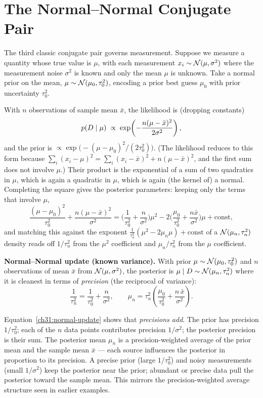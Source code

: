\section{The Normal--Normal Conjugate Pair}
\label{ch31:normal-normal}

The third classic conjugate pair governs measurement. Suppose we measure a quantity whose
true value is $\mu$, with each measurement $x_i \sim \mathcal{N}(\mu, \sigma^2)$ where the
measurement noise $\sigma^2$ is known and only the mean $\mu$ is unknown. Take a normal
prior on the mean, $\mu \sim \mathcal{N}(\mu_0, \tau_0^2)$, encoding a prior best guess $\mu_0$
with prior uncertainty $\tau_0^2$.

With $n$ observations of sample mean $\bar x$, the likelihood is (dropping
constants)
\[
  p(D\mid\mu)\;\propto\;\exp\!\left(-\frac{n(\mu-\bar x)^2}{2\sigma^2}\right),
\]
and the prior is $\propto \exp\!\big(-(\mu-\mu_0)^2/(2\tau_0^2)\big)$. (The likelihood
reduces to this form because $\sum_i (x_i-\mu)^2 = \sum_i (x_i-\bar x)^2 + n(\mu-\bar x)^2$,
and the first sum does not involve $\mu$.) Their product is the
exponential of a sum of two quadratics in $\mu$, which is again a quadratic in $\mu$, which
is again (the kernel of) a normal. Completing the square gives the posterior parameters:
keeping only the terms that involve $\mu$,
\[
  \frac{(\mu-\mu_0)^2}{\tau_0^2} + \frac{n(\mu-\bar x)^2}{\sigma^2}
  = \Big(\frac{1}{\tau_0^2} + \frac{n}{\sigma^2}\Big)\mu^2
    - 2\Big(\frac{\mu_0}{\tau_0^2} + \frac{n\bar x}{\sigma^2}\Big)\mu + \text{const},
\]
and matching this against the exponent $\frac{1}{\tau_n^2}(\mu^2 - 2\mu_n\mu) + \text{const}$
of a $\mathcal{N}(\mu_n, \tau_n^2)$ density reads off $1/\tau_n^2$ from the $\mu^2$ coefficient and
$\mu_n/\tau_n^2$ from the $\mu$ coefficient.

\begin{formalbox}
\textbf{Normal--Normal update (known variance).} With prior $\mu\sim\mathcal{N}(\mu_0,\tau_0^2)$
and $n$ observations of mean $\bar x$ from $\mathcal{N}(\mu,\sigma^2)$, the posterior is
$\mu\mid D \sim \mathcal{N}(\mu_n, \tau_n^2)$ where it is cleanest in terms of
\emph{precision} (the reciprocal of variance):
\begin{equation}
  \frac{1}{\tau_n^2} = \frac{1}{\tau_0^2} + \frac{n}{\sigma^2},
  \qquad
  \mu_n = \tau_n^2\!\left(\frac{\mu_0}{\tau_0^2} + \frac{n\,\bar x}{\sigma^2}\right).
  \label{ch31:normal-update}
\end{equation}
\end{formalbox}

Equation~\eqref{ch31:normal-update} shows that \emph{precisions add}. The prior
has precision $1/\tau_0^2$; each of the $n$ data points contributes precision
$1/\sigma^2$; the posterior precision is their sum. The posterior mean $\mu_n$
is a precision-weighted average of the prior mean and the sample mean $\bar x$ --- each source
influences the posterior in proportion to its precision. A precise prior (large
$1/\tau_0^2$) and noisy measurements (small $1/\sigma^2$) keep the posterior near the
prior; abundant or precise data pull the posterior toward the sample mean.
This mirrors the precision-weighted average structure seen in earlier examples.

